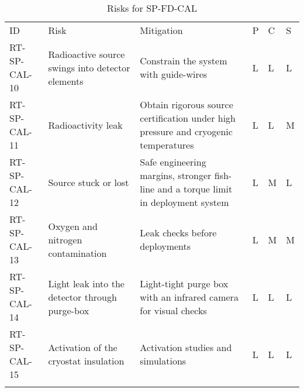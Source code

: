 
\begin{longtable}{p{}p{}p{}p{}p{}p{}} 
\caption{Risks for SP-FD-CAL } \\
\rowcolor{dunesky}
ID & Risk & Mitigation & P & C & S  \\  \colhline
RT-SP-CAL-10 & Radioactive source swings into detector elements & Constrain the system with guide-wires & L & L & L \\  \colhline
RT-SP-CAL-11 & Radioactivity leak & Obtain rigorous source certification under high pressure and cryogenic temperatures & L & L & M \\  \colhline
RT-SP-CAL-12 & Source stuck or lost & Safe engineering margins, stronger fish-line and a torque limit in deployment system & L & M & L \\  \colhline
RT-SP-CAL-13 & Oxygen and nitrogen contamination & Leak checks before deployments & L & M & M \\  \colhline
RT-SP-CAL-14 & Light leak into the detector through purge-box & Light-tight purge box with an infrared camera for visual checks & L & L & L \\  \colhline
RT-SP-CAL-15 & Activation of the cryostat insulation & Activation studies and simulations & L & L & L \\  \colhline

\label{tab:risks:SP-FD-CAL}
\end{longtable}